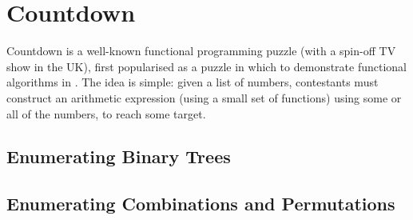 \chapter{Countdown}
Countdown is a well-known functional programming puzzle (with a spin-off TV show
in the UK), first popularised as a puzzle in which to demonstrate functional
algorithms in \cite{huttonCountdownProblem2002}.
The idea is simple: given a list of numbers, contestants must construct an
arithmetic expression (using a small set of functions) using some or all of the
numbers, to reach some target.

\section{Enumerating Binary Trees}
\section{Enumerating Combinations and Permutations}

